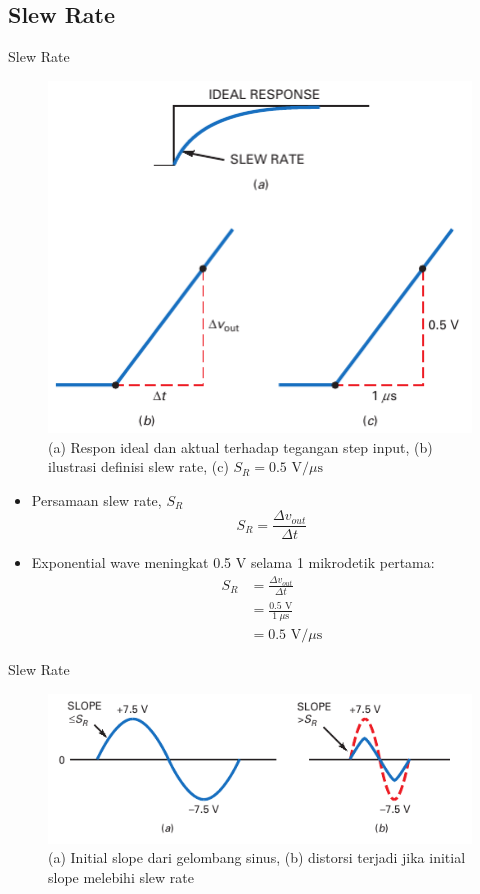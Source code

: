 \subsection{Slew Rate}
\begin{frame}{Slew Rate}
	\begin{multicols}{2}
		\begin{figure}
			\centering
			\includegraphics[width=0.8\linewidth]{gambar/fig-16.08}
			\caption{(a) Respon ideal dan aktual terhadap tegangan step input, (b) ilustrasi definisi slew rate, (c) $ S_R = 0.5 \text{ V/}\mu\text{s} $}
			\label{fig-16.08}
		\end{figure}
		\columnbreak
		\begin{itemize}
			\item Persamaan slew rate, $ S_R $
			\begin{equation}\label{pers.1}
				S_R = \frac{\Delta v_{out}}{\Delta t}
			\end{equation}
			\item Exponential wave meningkat 0.5 V selama 1 mikrodetik pertama:
			\begin{align*}
				S_R &= \frac{\Delta v_{out}}{\Delta t} \\
				&= \frac{0.5 \text{ V}}{1~\mu\text{s}} \\
				&= 0.5 \text{ V/}\mu\text{s}
			\end{align*}
		\end{itemize}
	\end{multicols}
\end{frame}

\begin{frame}{Slew Rate}
	\begin{figure}
		\centering
		\includegraphics[width=0.7\linewidth]{gambar/fig-16.09}
		\caption{(a) Initial slope dari gelombang sinus, (b) distorsi terjadi jika initial slope melebihi slew rate}
		\label{fig-16.09}
	\end{figure}
\end{frame}

